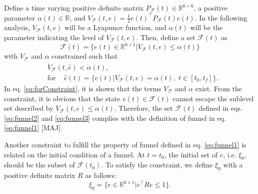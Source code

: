 \documentclass[letterpaper, 10 pt, conference]{ieeeconf}  %
\begin{document}
Define a time varying positive definite matrix $P_\mathcal{F}(t) \in \mathbb{R}^{6\times 6}$, a positive parameter $\alpha(t) \in \mathbb{R}$, and $V_\mathcal{F}(t,e) = \frac{1}{2}e(t)^\top P_\mathcal{F}(t) e(t)$.
In the following analysis, $V_\mathcal{F}(t,e)$ will be a Lyapunov function, and $\alpha(t)$ will be the parameter indicating the level of $V_\mathcal{F}(t,e)$.
Then, define a set $\mathcal{F}(t)$ as 
\begin{equation}
\mathcal{F}(t) = \{e(t) \in \mathbb{R}^{6\times 1} | V_\mathcal{F}(t,e) \leq \alpha(t)\} \label{eq:funnel2}
\end{equation}
with $V_\mathcal{F}$ and $\alpha$ constrained such that
\begin{align}
&\dot{V}_\mathcal{F}(t,\hat{e}) < \dot{\alpha}(t), \label{eq:funnel3} \\
&\text{for }\;\;\;\hat{e}(t) = \{e(t)|V_\mathcal{F}(t,e) = \alpha(t),\;t\in[t_0,t_f]\}. \nonumber
\end{align}
In eq. \eqref{eq:forConstraint}, it is shown that the terms $V_\mathcal{F}$ and $\alpha$ exist.
From the constraint, it is obvious that the state $e(t) \in \mathcal{F}(t)$ cannot escape the sublevel set described by $V_\mathcal{F}(t,e) \leq \alpha(t)$.
Therefore, the set $\mathcal{F}(t)$ defined in eqs. \eqref{eq:funnel2} and \eqref{eq:funnel3}
 complies with the definition of funnel in eq. \eqref{eq:funnel1} [MAJ]. 

Another constraint to fulfill the property of funnel defined in eq. \eqref{eq:funnel1} is related on the initial condition of a funnel. 
At $t = t_0$, the initial set of $e$, i.e. $\xi_0$, should be the subset of $\mathcal{F}(t_0)$. 
To satisfy the constraint, we define $\xi_0$ with a positive definite matrix $R$ as follows:
\begin{equation}
\xi_0 = \{e \in \mathbb{R}^{6\times1}|e^\top R e \leq 1\}.
\end{equation} 
\end{document}

